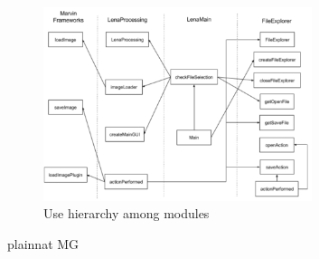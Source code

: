 \documentclass[12pt, titlepage]{article}
\begin{document}
\begin{figure}[H]
\centering
\includegraphics[width=0.7\textwidth]{Uses.PNG}
\caption{Use hierarchy among modules}
\label{FigUH}
\end{figure}


 {plainnat}
 {MG}
\end{document}
